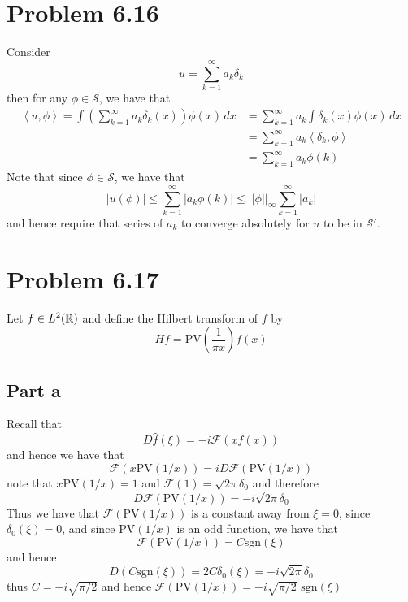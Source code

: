 \documentclass[12pt]{report}
\newcommand{\norm}[1]{\left|\left|#1\right|\right|}
\newcommand{\inner}[2]{\left\langle#1,#2\right\rangle}
\begin{document}
\maketitle

\section*{Problem 6.16}
Consider 
\begin{equation*}
    u = \sum_{k=1}^\infty a_k \delta_k
\end{equation*}
then for any $\phi \in \mathcal{S}$, we have that
\begin{align*}
    \inner{u}{\phi} = \int \left(\sum_{k=1}^\infty a_k \delta_k(x) \right) \phi(x) \, dx &= \sum_{k=1}^\infty a_k \int \delta_k(x) \phi(x) \, dx \\
    &= \sum_{k=1}^\infty a_k \inner{\delta_k}{\phi} \\
    &= \sum_{k=1}^\infty a_k \phi(k)
\end{align*}
Note that since $\phi \in \mathcal{S}$, we have that 
\begin{equation*}
    |u(\phi)| \leq \sum_{k=1}^\infty |a_k \phi(k)| \leq \norm{\phi}_\infty \sum_{k=1}^\infty |a_k|
\end{equation*}
and hence require that series of $a_k$ to converge absolutely for $u$ to be in $\mathcal{S}'$.

\section*{Problem 6.17}
Let $f \in L^2(\mathbb{R})$ and define the Hilbert transform of $f$ by
\begin{equation*}
    Hf = \text{PV}\left(\frac{1}{\pi x}\right)  f(x)
\end{equation*}
\subsection*{Part a}
Recall that 
\begin{equation*}
    D \hat{f}(\xi) = -i \mathcal{F}(xf(x))
\end{equation*}
and hence we have that
\begin{equation*}
    \mathcal{F}(x \text{PV}(1/x)) = i D \mathcal{F}(\text{PV}(1/x))
\end{equation*}
note that $x\text{PV}(1/x) = 1$ and $\mathcal{F}(1) = \sqrt{2\pi} \delta_0$ and therefore
\begin{equation*}
     D \mathcal{F}(\text{PV}(1/x)) = -i\sqrt{2\pi} \delta_0
\end{equation*}
Thus we have that $\mathcal{F}(\text{PV}(1/x))$ is a constant away from $\xi = 0$, since $\delta_0(\xi) = 0$, and since $\text{PV}(1/x)$ is an odd function, we have that 
\begin{equation*}
    \mathcal{F}(\text{PV}(1/x)) = C\text{sgn}(\xi)
\end{equation*}
and hence
\begin{equation*}
    D( C\text{sgn}(\xi)) = 2C\delta_0(\xi) = -i\sqrt{2\pi} \delta_0
\end{equation*}
thus $C = -i\sqrt{\pi/2}$ and hence $\mathcal{F}(\text{PV}(1/x)) = -i\sqrt{\pi/2} \text{ sgn}(\xi)$
\end{document}
